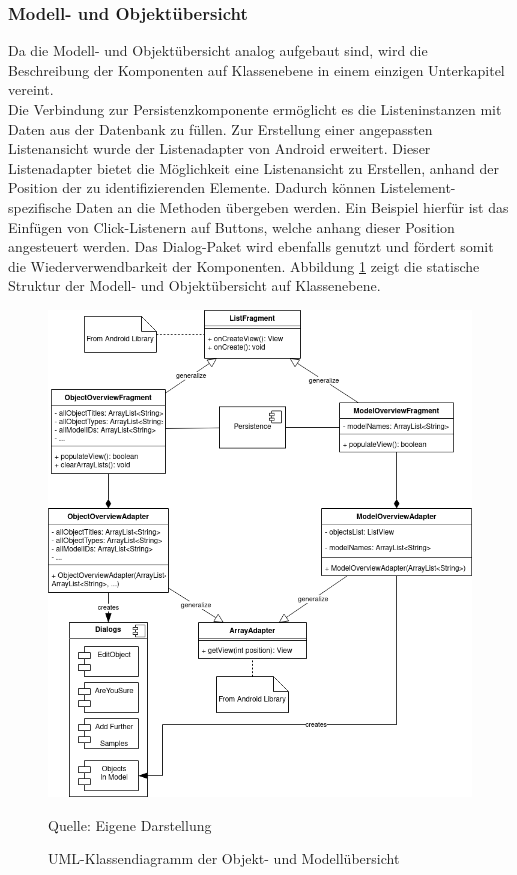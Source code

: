 \documentclass[oneside]{ausarbeitung}
\begin{document}
\subsubsection{Modell- und Objektübersicht}
Da die Modell- und Objektübersicht analog aufgebaut sind, wird die Beschreibung der Komponenten auf Klassenebene in einem einzigen Unterkapitel vereint.\\
Die Verbindung zur Persistenzkomponente ermöglicht es die Listeninstanzen mit Daten aus der Datenbank zu füllen. Zur Erstellung einer angepassten Listenansicht wurde der Listenadapter von Android erweitert. Dieser Listenadapter bietet die Möglichkeit eine Listenansicht zu Erstellen, anhand der Position der zu identifizierenden Elemente. Dadurch können Listelement-spezifische Daten an die Methoden übergeben werden. Ein Beispiel hierfür ist das Einfügen von Click-Listenern auf Buttons, welche anhang dieser Position angesteuert werden. Das Dialog-Paket wird ebenfalls genutzt und fördert somit die Wiederverwendbarkeit der Komponenten. Abbildung \ref{fig:overview-classdiagram} zeigt die statische Struktur der Modell- und Objektübersicht auf Klassenebene.
\begin{figure}[hptb]
	\centering
	\includegraphics[height=0.7\textheight]{images/object-overview-class-diagram.png}
	\caption{UML-Klassendiagramm der Objekt- und Modellübersicht} Quelle: Eigene Darstellung
	\label{fig:overview-classdiagram}
\end{figure}
\end{document}
